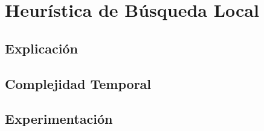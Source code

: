 \section{Heur\'istica de B\'usqueda Local}
\subsection{Explicaci\'on}
\subsection{Complejidad Temporal}
\subsection{Experimentaci\'on}
